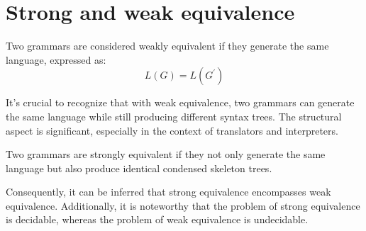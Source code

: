 \section{Strong and weak equivalence}

\begin{definition}
    Two grammars are considered weakly equivalent if they generate the same language, expressed as:
    \[L(G)=L(G^{'})\]
\end{definition}
It's crucial to recognize that with weak equivalence, two grammars can generate the same language while still producing different syntax trees. 
The structural aspect is significant, especially in the context of translators and interpreters.
\begin{definition}
    Two grammars are strongly equivalent if they not only generate the same language but also produce identical condensed skeleton trees.
\end{definition}
Consequently, it can be inferred that strong equivalence encompasses weak equivalence. 
Additionally, it is noteworthy that the problem of strong equivalence is decidable, whereas the problem of weak equivalence is undecidable.